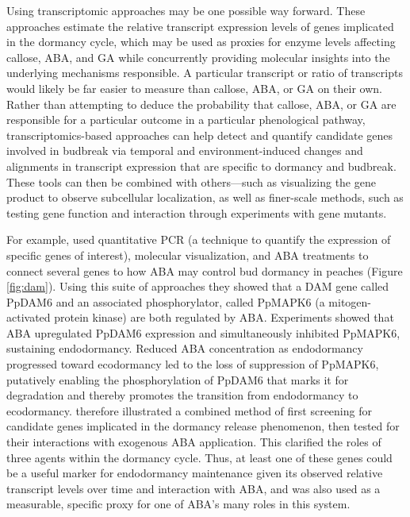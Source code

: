 \documentclass[11pt]{article}
\begin{document}
Using transcriptomic approaches may be one possible way forward.  These approaches estimate the relative transcript expression levels of genes implicated in the dormancy cycle, which may be used as proxies for enzyme levels affecting callose, ABA, and GA while concurrently providing molecular insights into the underlying mechanisms responsible. A particular transcript or ratio of transcripts would likely be far easier to measure than callose, ABA, or GA on their own. Rather than attempting to deduce the probability that callose, ABA, or GA are responsible for a particular outcome in a particular phenological pathway, transcriptomics-based approaches can help detect and quantify candidate genes involved in budbreak via temporal and environment-induced changes and alignments in transcript expression that are specific to dormancy and budbreak. These tools can then be combined with others---such as visualizing the gene product to observe subcellular localization, as well as finer-scale methods, such as testing gene function and interaction through experiments with gene mutants. 

For example, \citet{zhang2023ppmapk6} used quantitative PCR (a technique to quantify the expression of specific genes of interest), molecular visualization, and ABA treatments to connect several genes to how ABA may control bud dormancy in peaches (Figure \ref{fig:dam}). Using this suite of approaches they showed that a DAM gene called PpDAM6 \citep[MADS-box dormancy associated genes, which are important central regulators of bud dormancy in perennial species][]{falavigna2019want,yang2021bud} and an associated phosphorylator, called PpMAPK6 (a mitogen-activated protein kinase) are both regulated by ABA. Experiments showed that ABA upregulated PpDAM6 expression and simultaneously inhibited PpMAPK6, sustaining endodormancy. Reduced ABA concentration as endodormancy progressed toward ecodormancy led to the loss of suppression of PpMAPK6, putatively enabling the phosphorylation of PpDAM6 that marks it for degradation and thereby promotes the transition from endodormancy to ecodormancy. \citet{zhang2023ppmapk6} therefore illustrated a combined method of first screening for candidate genes implicated in the dormancy release phenomenon, then tested for their interactions with exogenous ABA application. This clarified the roles of three agents within the dormancy cycle. Thus, at least one of these genes could be a useful marker for endodormancy maintenance given its observed relative transcript levels over time and interaction with ABA, and was also used as a measurable, specific proxy for one of ABA’s many roles in this system. %
\end{document}
